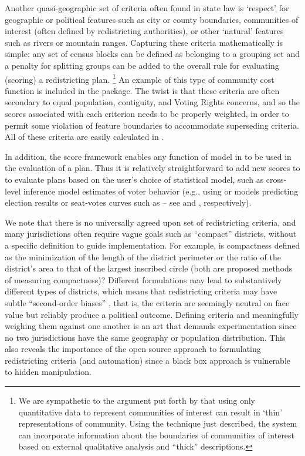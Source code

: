 \documentclass[article]{JSSstyle/jss}
\begin{document}
Another quasi-geographic set of criteria often found in state law is  
`respect' for geographic or political features such as city or county 
boundaries, communities of interest (often defined by redistricting 
authorities), or other `natural'  features such as rivers or mountain ranges.  
Capturing these criteria mathematically is simple: any set 
of census blocks can be defined as belonging to a grouping set and
a penalty for splitting groups can be added to the overall rule for evaluating (scoring) a redistricting plan.
\footnote{We are sympathetic to the argument put forth by \citet[][]{Forest04} 
that using only quantitative data to represent communities of interest can result
in `thin' representations of community. Using the technique just described, the  system can incorporate
information about the boundaries of communities of interest based on external qualitative 
analysis and ``thick'' descriptions.}  An example of this type of community cost 
function is included in the  package.  The twist is that these criteria are 
often secondary to equal population, contiguity, and Voting Rights concerns, and so the scores
associated with each criterion needs to be properly weighted, in order to permit 
some violation of feature boundaries to accommodate superseding criteria.
All of these criteria are easily calculated in .

In addition, the  score 
framework enables any function of model in  to be used in the evaluation of 
a plan. Thus it is relatively straightforward to add new scores to  to evaluate plans 
based on the user's choice of statistical model, such as cross-level inference model 
estimates of voter behavior (e.g., using  or  models predicting 
election results or seat-votes curves such as  --  see \citet{Imai07} and \citet{GelKing07}, respectively).

We note that there is no universally agreed upon set of redistricting criteria, and many jurisdictions
often require vague goals such as ``compact'' districts, without a specific definition to
guide implementation.  For example, is compactness defined as the minimization of the 
length of the district perimeter or the ratio of the district's area to that of the largest inscribed circle
(both are proposed methods of measuring compactness)?  Different formulations may lead to substantively
different types of districts, which means that redistricting criteria may have subtle
``second-order biases'' \citep[][]{Parker90}, that is, the criteria are seemingly 
neutral on face value but reliably produce a political outcome.  Defining criteria 
and meaningfully weighing them against one another is an art that demands experimentation 
since no two jurisdictions have the same geography or population distribution.  This 
also reveals the importance of the open source approach to formulating redistricting criteria (and automation) 
since a black box approach is vulnerable to hidden manipulation.  
\end{document}
